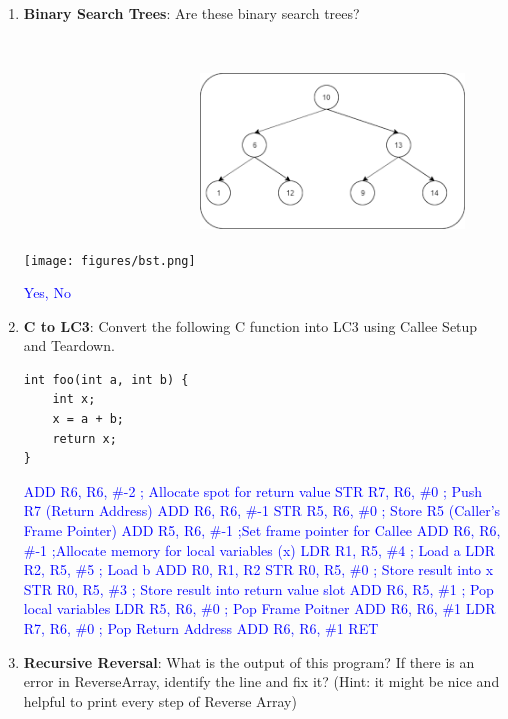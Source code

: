 \documentclass{article}
\begin{document}
\begin{enumerate}[label=(\alph*)]
    \item \textbf{Binary Search Trees}: Are these binary search trees?
    
    \texttt{[image: figures/bst.png]}
    \includegraphics[width=7cm,height=6cm]{figures/notbst.png}
    
    \textcolor{blue}{Yes, No}
    \newpage
    \item \textbf{C to LC3}: Convert the following C function into LC3 using Callee Setup and Teardown.
    \begin{lstlisting}[style=CStyle] 
int foo(int a, int b) {
    int x;
    x = a + b;
    return x;
}\end{lstlisting}
    \textcolor{blue}{
    ADD R6, R6, \#-2 \hfill ; Allocate spot for return value\newline
    STR R7, R6, \#0    \hfill ; Push R7 (Return Address) \newline
    ADD R6, R6, \#-1  \newline
    STR R5, R6, \#0    \hfill ; Store R5 (Caller's Frame Pointer) \newline
    ADD R5, R6, \#-1 \hfill ;Set frame pointer for Callee \newline
    ADD R6, R6, \#-1 \hfill ;Allocate memory for local variables (x) \newline
    LDR R1, R5, \#4 \hfill ; Load a \newline 
    LDR R2, R5, \#5 \hfill ; Load b\newline
    ADD R0, R1, R2 \newline 
    STR R0, R5, \#0 \hfill ; Store result into x \newline
    STR R0, R5, \#3 \hfill ; Store result into return value slot \newline
    ADD R6, R5, \#1 \hfill ; Pop local variables\newline
    LDR R5, R6, \#0 \hfill ; Pop Frame Poitner\newline
    ADD R6, R6, \#1 \newline
    LDR R7, R6, \#0 \hfill ; Pop Return Address\newline
    ADD R6, R6, \#1 \newline
    RET
    \newline
}
    \item \textbf{Recursive Reversal}: What is the output of this program? If there is an error in ReverseArray, identify the line and fix it? (Hint: it might be nice and helpful to print every step of Reverse Array)
    

\end{enumerate}
\end{document}
